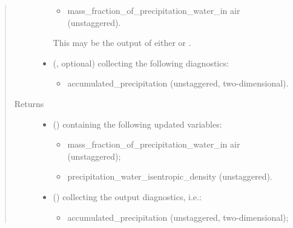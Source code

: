 \documentclass[letterpaper,10pt,english]{sphinxmanual}
\begin{document}
\begin{fulllineitems}
\begin{fulllineitems}
\begin{quote}
\begin{description}
\begin{itemize}
\begin{itemize}
\item {} 
mass\_fraction\_of\_precipitation\_water\_in air (unstaggered).

\end{itemize}

This may be the output of either
{\hyperref[\detokenize{api:tasmania.dycore.prognostic_isentropic.PrognosticIsentropic.step_neglecting_vertical_advection}]{}} or
{\hyperref[\detokenize{api:tasmania.dycore.prognostic_isentropic.PrognosticIsentropic.step_coupling_physics_with_dynamics}]{}}.


\item {} 
 (, optional) \textendash{} 
{\hyperref[\detokenize{api:tasmania.storages.grid_data.GridData}]{}} collecting the following diagnostics:
\begin{itemize}
\item {} 
accumulated\_precipitation (unstaggered, two-dimensional).

\end{itemize}


\end{itemize}

\item[{Returns}] \leavevmode
\begin{itemize}
\item {} 
 () \textendash{} {\hyperref[\detokenize{api:tasmania.storages.state_isentropic.StateIsentropic}]{}} containing the following updated variables:
\begin{itemize}
\item {} 
mass\_fraction\_of\_precipitation\_water\_in air (unstaggered);

\item {} 
precipitation\_water\_isentropic\_density (unstaggered).

\end{itemize}

\item {} 
 () \textendash{} {\hyperref[\detokenize{api:tasmania.storages.grid_data.GridData}]{}} collecting the output diagnostics, i.e.:
\begin{itemize}
\item {} 
accumulated\_precipitation (unstaggered, two-dimensional);


\end{itemize}
\end{itemize}
\end{description}
\end{quote}
\end{fulllineitems}
\end{fulllineitems}
\end{document}
